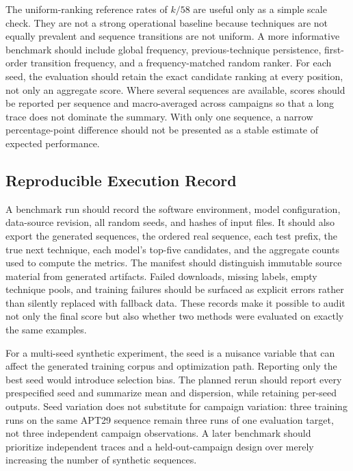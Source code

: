 \documentclass[conference]{IEEEtran}
\begin{document}
The uniform-ranking reference rates of $k/58$ are useful only as a simple scale check. They are not a strong operational baseline because techniques are not equally prevalent and sequence transitions are not uniform. A more informative benchmark should include global frequency, previous-technique persistence, first-order transition frequency, and a frequency-matched random ranker. For each seed, the evaluation should retain the exact candidate ranking at every position, not only an aggregate score. Where several sequences are available, scores should be reported per sequence and macro-averaged across campaigns so that a long trace does not dominate the summary. With only one sequence, a narrow percentage-point difference should not be presented as a stable estimate of expected performance.

\subsection{Reproducible Execution Record}
A benchmark run should record the software environment, model configuration, data-source revision, all random seeds, and hashes of input files. It should also export the generated sequences, the ordered real sequence, each test prefix, the true next technique, each model's top-five candidates, and the aggregate counts used to compute the metrics. The manifest should distinguish immutable source material from generated artifacts. Failed downloads, missing labels, empty technique pools, and training failures should be surfaced as explicit errors rather than silently replaced with fallback data. These records make it possible to audit not only the final score but also whether two methods were evaluated on exactly the same examples.

For a multi-seed synthetic experiment, the seed is a nuisance variable that can affect the generated training corpus and optimization path. Reporting only the best seed would introduce selection bias. The planned rerun should report every prespecified seed and summarize mean and dispersion, while retaining per-seed outputs. Seed variation does not substitute for campaign variation: three training runs on the same APT29 sequence remain three runs of one evaluation target, not three independent campaign observations. A later benchmark should prioritize independent traces and a held-out-campaign design over merely increasing the number of synthetic sequences.
\end{document}

